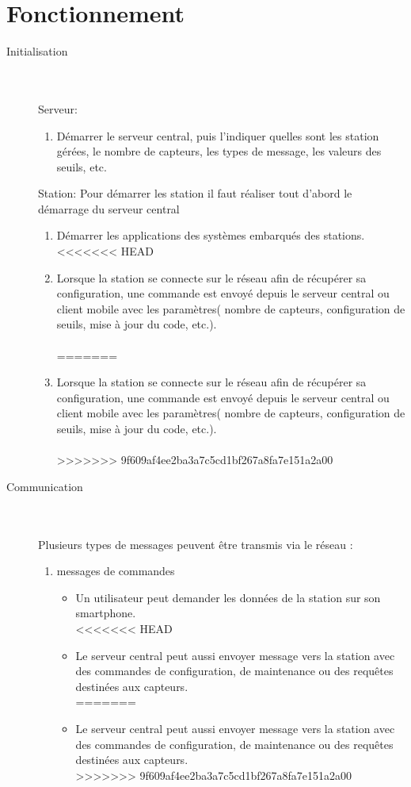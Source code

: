 \documentclass [a4paper] {report}
\begin{document}
\section{Fonctionnement}

\begin{description}

\item[Initialisation]\hfill\\
	\\Serveur:
	\begin{enumerate}
	\item Démarrer le serveur central, puis l'indiquer quelles sont les station gérées, le nombre de capteurs, les types de message, les valeurs des seuils, etc.\\
	\end{enumerate}
	Station: 
	Pour démarrer les station il faut réaliser tout d'abord le démarrage du serveur central
	\begin{enumerate}
	\item Démarrer les applications des systèmes embarqués des stations.
<<<<<<< HEAD
	\item Lorsque la station se connecte sur le réseau afin de récupérer sa configuration, une commande est envoyé 
	depuis le serveur central ou client mobile avec les paramètres( nombre de capteurs, configuration de seuils, mise à jour du code, etc.).\\\\
=======
	\item Lorsque la station se connecte sur le réseau afin de récupérer sa configuration, une commande est envoyé depuis le serveur central ou client mobile avec les paramètres( nombre de capteurs, configuration de seuils, mise à jour du code, etc.).\\\\
>>>>>>> 9f609af4ee2ba3a7c5cd1bf267a8fa7e151a2a00
	\end{enumerate}

\item [Communication]\hfill\\
	\\Plusieurs types de messages peuvent être transmis via le réseau :\\
	\begin{enumerate}
	\item messages de commandes \\
		\begin{itemize}
		\item Un utilisateur peut demander les données de la station sur son smartphone.\\
<<<<<<< HEAD
		\item Le serveur central peut aussi envoyer message vers la station avec des commandes 
		de configuration, de maintenance ou des requêtes destinées aux capteurs.\\
=======
		\item Le serveur central peut aussi envoyer message vers la station avec des commandes de configuration, de maintenance ou des requêtes destinées aux capteurs.\\
>>>>>>> 9f609af4ee2ba3a7c5cd1bf267a8fa7e151a2a00
		\end{itemize}
	

\end{enumerate}
\end{description}
\end{document}
